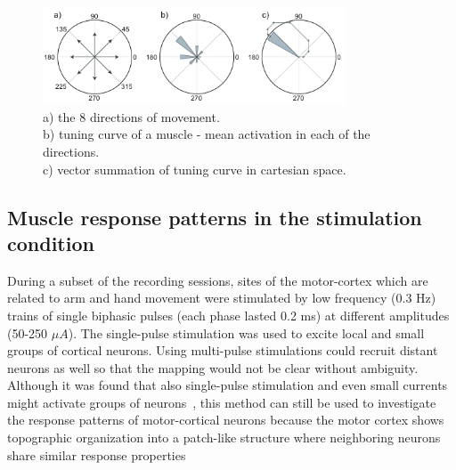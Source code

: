 \begin{figure}[ht]
	\centering
		\includegraphics[width=0.8\textwidth]{images/pd.jpg}
	\caption
	{
	a) the 8 directions of movement. \\
	b) tuning curve of a muscle - mean activation in each of the directions. \\
	c) vector summation of tuning curve in cartesian space. \\
	}
	\label{sg:fig:images_pd}
\end{figure}



% 
\subsection{Muscle response patterns in the stimulation condition} %
\label{sg:sub:evoked_responses}

During a subset of the recording sessions, sites of the motor-cortex which are related to arm and hand movement were stimulated by low frequency (0.3 Hz) trains of single biphasic pulses (each phase lasted 0.2 ms) at different amplitudes (50-250 $\mu A$). The single-pulse stimulation was used to excite local and small groups of cortical neurons. Using multi-pulse stimulations could recruit distant neurons as well so that the mapping would not be clear without ambiguity. Although it was found that also single-pulse stimulation and even small currents might activate groups of neurons~\citet{Tehovnik:1996p3982}, this method can still be used to investigate the response patterns of motor-cortical neurons because the motor cortex shows topographic organization into a patch-like structure where neighboring neurons share similar response properties~\citet{Lee:1998p4164}

